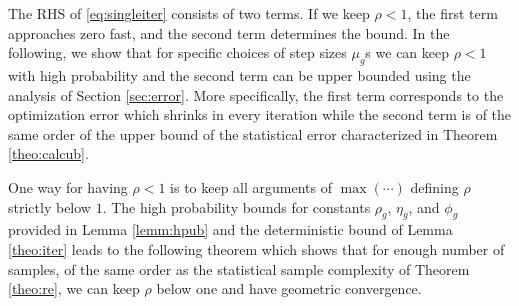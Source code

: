 The RHS of \eqref{eq:singleiter} consists of two terms.
If we keep $\rho < 1$, the first term approaches zero fast, and the second term determines the bound. 
In the following, we show that for specific choices of step sizes $\mu_g$s we can keep $\rho < 1$ with high probability and the second term can be upper bounded using the analysis of Section \ref{sec:error}.
More specifically, the first term corresponds to the optimization error which shrinks in every iteration while the second term is of the same order of the upper bound of the statistical error characterized in Theorem \ref{theo:calcub}.

One way for having $\rho < 1$ is to keep all arguments of $\max(\cdots)$  defining $\rho$ strictly below $1$. %
The high probability bounds for constants $\rho_g$, $\eta_g$, and $\phi_g$ provided in Lemma \ref{lemm:hpub} and the deterministic bound of Lemma \ref{theo:iter} leads to the following theorem which shows that for enough number of samples, of the same order as the statistical sample complexity of  Theorem \ref{theo:re}, we can keep $\rho$ below one and have geometric convergence.





